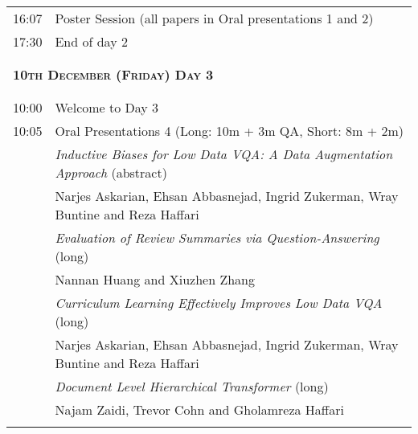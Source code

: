 \begin{longtable}{rl}
16:07  & Poster Session (all papers in Oral presentations 1 and 2)\\
17:30  & End of day 2\\ \\

\\

\multicolumn{2}{l}{\bf \textsc{ \bf 10th December (Friday) Day 3}} \\
\hline \\ \\

10:00 &  Welcome to Day 3\\
10:05 &   Oral Presentations 4 (Long: 10m + 3m QA, Short: 8m + 2m) \\
&  \emph{Inductive Biases for Low Data VQA: A Data Augmentation Approach} (abstract) \\
&  \hspace{.25cm} Narjes Askarian, Ehsan Abbasnejad, Ingrid Zukerman, Wray Buntine and Reza Haffari \\
&  \emph{Evaluation of Review Summaries via Question-Answering} (long) \\
&  \hspace{.25cm} Nannan Huang and Xiuzhen Zhang  \\
&  \emph{Curriculum Learning Effectively Improves Low Data VQA} (long) \\
&  \hspace{.25cm} Narjes Askarian, Ehsan Abbasnejad, Ingrid Zukerman, Wray Buntine and Reza Haffari  \\
&  \emph{Document Level Hierarchical Transformer} (long) \\
&  \hspace{.25cm} Najam Zaidi, Trevor Cohn and Gholamreza Haffari \\ \\


\end{longtable}
